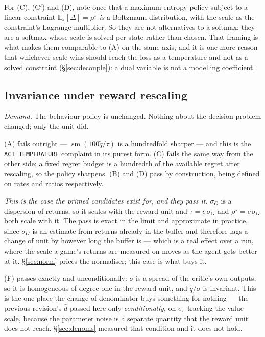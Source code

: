 \documentclass{article}
\newcommand{\E}{\mathbb{E}}
\DeclareMathOperator{\sm}{sm}
\newcommand{\gap}{\Delta}
\newcommand{\dbar}{\bar{d}}
\newcommand{\srank}{\sigma}
\newcommand{\snorm}{\sigma_{G}}
\newcommand{\snoise}{\sigma_{\varepsilon}}
\begin{document}
For (C), (C$'$) and (D), note once that a maximum-entropy policy subject to a linear constraint
$\E_\pi[\gap] = \rho^\star$ \emph{is} a Boltzmann distribution, with the scale as the
constraint's Lagrange multiplier. So they are not alternatives to a softmax; they are a softmax
whose scale is solved per state rather than chosen. That framing is what makes them comparable to
(A) on the same axis, and it is one more reason that whichever scale wins should reach the loss
as a temperature and not as a solved constraint (\S\ref{sec:decouple}): a dual variable is not a
modelling coefficient.

\subsection{Invariance under reward rescaling}
\label{sec:c1}

\emph{Demand.} The behaviour policy is unchanged. Nothing about the decision problem changed;
only the unit did.

(A) fails outright --- $\sm(100\tilde{q}/\tau)$ is a hundredfold sharper --- and this is the
\texttt{ACT\_TEMPERATURE} complaint in its purest form. (C) fails the same way from the other
side: a fixed regret budget is a hundredth of the available regret after rescaling, so the policy
sharpens. (B) and (D) pass by construction, being defined on rates and ratios respectively.

\emph{This is the case the primed candidates exist for, and they pass it.} $\snorm$ is a
dispersion of returns, so it scales with the reward unit and $\tau = c\,\snorm$ and
$\rho^\star = c\,\snorm$ both scale with it. The pass is exact in the limit and approximate in
practice, since $\snorm$ is an estimate from returns already in the buffer and therefore lags
a change of unit by however long the buffer is --- which is a real effect over a run, where the
scale a game's returns are measured on moves as the agent gets better at it. \S\ref{sec:norm}
prices the normaliser; this case is what buys it.

(F) passes exactly and unconditionally: $\srank$ is a spread of the critic's own outputs, so it
is homogeneous of degree one in the reward unit, and $\tilde{q}/\srank$ is invariant. This is the
one place the change of denominator buys something for nothing --- the previous revision's
$\dbar$ passed here only \emph{conditionally}, on $\snoise$ tracking the value scale, because the
parameter noise is a separate quantity that the reward unit does not reach. \S\ref{sec:denoms}
measured that condition and it does not hold.
\end{document}
